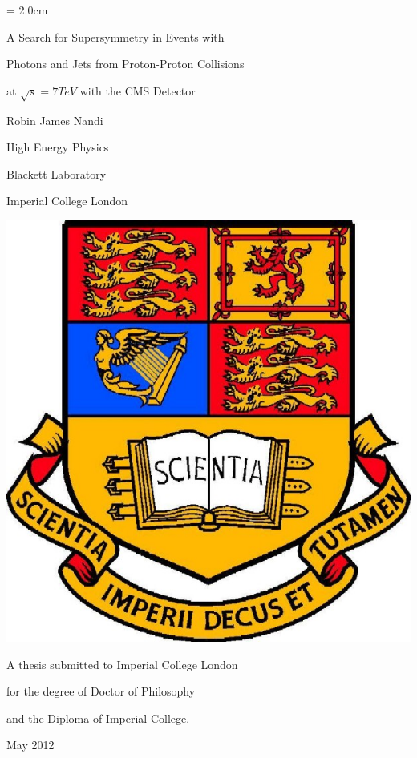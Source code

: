 \begin{titlepage}
\topmargin = 2.0cm
\begin{center}
{\bf 
\centerline{\Large A Search for Supersymmetry in Events with}
\centerline{\Large Photons and Jets from Proton-Proton Collisions}
\centerline{\Large at $\sqrt{s} = 7 \unit{TeV}$ with the CMS Detector}}
\vspace{1.3cm}
\centerline{\Large Robin James Nandi}
\vspace{0.8cm}
\centerline{\large High Energy Physics}
\centerline{\large Blackett Laboratory}
\centerline{\large Imperial College London}
\vspace{1.0cm}
\includegraphics[scale=0.3]{title/ICcrest.jpg} \\
\vspace{1.0cm}
\centerline{\large A thesis submitted to Imperial College London}
\centerline{\large for the degree of Doctor of Philosophy}
\centerline{\large and the Diploma of Imperial College.}
\vspace{0.5cm}
\centerline{\large May 2012}
\end{center}
\end{titlepage}
